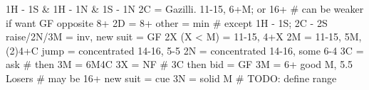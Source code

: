 1H - 1S & 1H - 1N & 1S - 1N
2C = Gazilli. 11-15, 6+M; or 16+  # can be weaker if want GF opposite 8+
    2D = 8+
    other = min  # except 1H - 1S; 2C - 2S
        raise/2N/3M = inv, new suit = GF
2X (X < M) = 11-15, 4+X
2M = 11-15, 5M, (2)4+C
jump = concentrated 14-16, 5-5
2N = concentrated 14-16, some 6-4
    3C = ask  # then 3M = 6M4C
    3X = NF  # 3C then bid = GF
3M = 6+ good M, 5.5 Losers  # may be 16+
    new suit = cue
3N = solid M  # TODO: define range